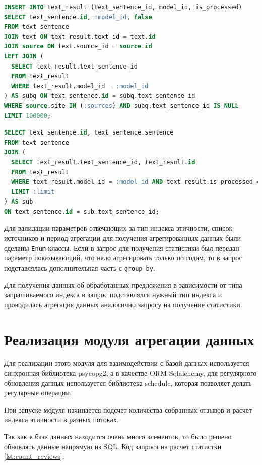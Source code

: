 \documentclass[PI, VKR]{HSEUniversity}
\begin{document}
\begin{lstlisting}[language=SQL,label=lst:insert_unused,caption={SQL запрос на вставку не обработанных предложений},captionpos=b,numbers=none]
INSERT INTO text_result (text_sentence_id, model_id, is_processed)
SELECT text_sentence.id, :model_id, false
FROM text_sentence
JOIN text ON text_result.text_id = text.id
JOIN source ON text.source_id = source.id
LEFT JOIN (
  SELECT text_result.text_sentence_id
  FROM text_result
  WHERE text_result.model_id = :model_id
) AS subq ON text_sentence.id = subq.text_sentence_id
WHERE source.site IN (:sources) AND subq.text_sentence_id IS NULL
LIMIT 100000;
\end{lstlisting}

\begin{lstlisting}[language=SQL,label=lst:select_unused,caption={SQL запрос на получение еще не обработанных предложений},captionpos=b,numbers=none]
SELECT text_sentence.id, text_sentence.sentence
FROM text_sentence
JOIN (
  SELECT text_result.text_sentence_id, text_result.id
  FROM text_result
  WHERE text_result.model_id = :model_id AND text_result.is_processed = false
  LIMIT :limit
) AS sub
ON text_sentence.id = sub.text_sentence_id;
\end{lstlisting}

Для валидации параметров отвечающих за тип индекса этичности, список источников и период агрегации для получения агрегированных данных были сделаны \texttt{Enum}-классы. Если в запрос для получения статистики был передан параметр показывающий, что надо агрегировать только по годам, то в запрос подставлялась дополнительная часть с \texttt{group by}.

Для получения данных об обработанных предложения в зависимости от типа запрашиваемого индекса в запрос подставлялся нужный тип индекса и проводилась агрегация данных аналогично запросу на получение статистики.
\section{Реализация модуля агрегации данных}
\label{sec:org0ace11e}
Для реализации этого модуля для взаимодействии с базой данных используется синхронная библиотека psycopg2, а в качестве ORM Sqlalchemy, для регулярного обновления данных используется библиотека schedule, которая позволяет делать регулярные операции.

При запуске модуля начинается подсчет количества собранных отзывов и расчет индекса этичности в разных потоках.

Так как в базе данных находится очень много элементов, то было решено обновлять данные напрямую из SQL. Код запроса на расчет статистки \ref{lst:count_reviews}.
\end{document}
